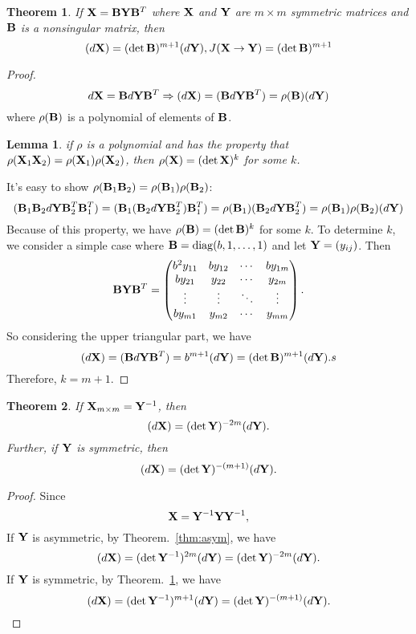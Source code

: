 \documentclass[11pt]{article}
\def\B{{\bf B}}
\def\X{{\bf X}}
\def\Y{{\bf Y}}
\def\diag{\mathrm{diag}}
\newtheorem{theorem}{Theorem}[section]
\newtheorem{lemma}{Lemma}[section]
\begin{document}
\begin{theorem} \label{thm:sym}
	If $\X=\B\Y\B^T$ where $\X$ and $\Y$ are $m\times m$ symmetric matrices and $\B$ is a nonsingular matrix, then
	\begin{equation}
		(d\X) = (\det\B)^{m+1}(d\Y),
		J(\X\rightarrow\Y) = (\det\B)^{m+1}
	\end{equation}
\end{theorem}
\begin{proof}
	\begin{equation}
		d\X = \B d\Y\B^T \Rightarrow (d\X) = (\B d\Y\B^T) = \rho(\B)(d\Y)
	\end{equation}
	where $\rho(\B)$ is a polynomial of elements of $\B$.
	\begin{lemma}
		if $\rho$ is a polynomial and has the property that $\rho(\X_1\X_2) = \rho(\X_1)\rho(\X_2)$, then $\rho(\X)=(\det \X)^k$ for some $k$.
	\end{lemma}
	It's easy to show $\rho(\B_1\B_2)=\rho(\B_1)\rho(\B_2)$:
	\begin{equation}
		(\B_1\B_2d\Y\B_2^T\B_1^T) = (\B_1(\B_2d\Y\B_2^T)\B_1^T) = \rho(\B_1)(\B_2d\Y\B_2^T) = \rho(\B_1)\rho(\B_2) (d\Y)
	\end{equation}
	Because of this property, we have $\rho(\B) = (\det\B)^k $ for some $k$.
	To determine $k$, we consider a simple case where $\B = \diag(b,1,\dots,1)$ and let $\Y = (y_{ij})$. Then
	$$ \B\Y\B^T =
		\begin{pmatrix}
			b^2y_{11}	& b y_{12}	& \cdots 	& b y_{1m}\\
			b y_{21}	& y_{22}	& \cdots 	& y_{2m}\\
			\vdots 	& \vdots 	& \ddots 	& \vdots \\
			b y_{m1} 	& y_{m2} 	& \cdots 	& y_{mm}\\
		\end{pmatrix}.
	$$
	So considering the upper triangular part, we have
	$$(d\X) = (\B d\Y\B^T) = b^{m+1}(d\Y) = (\det\B)^{m+1}(d\Y).s$$
	Therefore, $k = m+1$.
\end{proof}

\begin{theorem}
	If $\X_{m\times m} = \Y^{-1}$, then 
		$$(d\X) = (\det\Y)^{-2m}(d\Y).$$
	Further, if $\Y$ is symmetric, then 
		$$(d\X) = (\det\Y)^{-(m+1)}(d\Y).$$
\end{theorem}
\begin{proof}
	Since 
		$$\X = \Y^{-1}\Y\Y^{-1},$$
	If $\Y$ is asymmetric, by Theorem.~\ref{thm:asym}, we have
		$$(d\X) = (\det\Y^{-1})^{2m}(d\Y) = (\det\Y)^{-2m}(d\Y).$$
	If $\Y$ is symmetric, by Theorem.~\ref{thm:sym}, we have
		$$(d\X) = (\det\Y^{-1})^{m+1}(d\Y) = (\det\Y)^{-(m+1)}(d\Y).$$
\end{proof}
\end{document}
